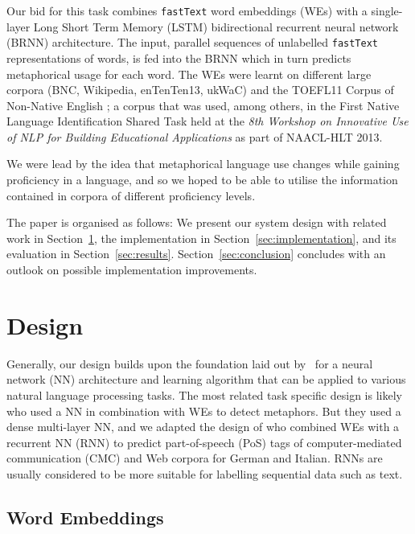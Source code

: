 \documentclass[11pt,a4paper]{article}
\newcommand\fT{\texttt{fastText}\xspace}
\begin{document}
Our bid for this task combines \fT \cite{bojanowski2016enriching} word embeddings (WEs) with a single-layer Long Short Term Memory (LSTM) bidirectional recurrent neural network (BRNN) architecture.
The input, parallel sequences of unlabelled \fT representations of words, is fed into the BRNN which in turn predicts metaphorical usage for each word. 
The WEs were learnt on different large corpora (BNC, Wikipedia, enTenTen13, ukWaC) and the TOEFL11 Corpus of Non-Native English \cite{ETS2:ETS202331}; a corpus that was used, among others, in the First Native Language Identification Shared Task \cite{tetreault-blanchard-cahill:2013:BEA} held at the \emph{8th Workshop on Innovative Use of NLP for Building Educational Applications} as part of NAACL-HLT 2013.

We were lead by the idea that metaphorical language use changes while gaining proficiency in a language, and so we hoped to be able to utilise the information contained in corpora of different proficiency levels.

The paper is organised as follows: We present our system design with related work in
Section~\ref{sec:design}, the implementation in
Section~\ref{sec:implementation}, and its evaluation in
Section~\ref{sec:results}. 
Section~\ref{sec:conclusion} concludes with an outlook on possible
implementation improvements.



\section{Design} %
\label{sec:design}

Generally, our design builds upon the foundation laid out by~ for a neural network (NN) architecture and learning algorithm that can be applied to various natural language processing tasks.
The most related task specific design is likely  who used a NN in combination with WEs to detect metaphors. 
But they used a dense multi-layer NN, and we adapted the design of  who combined WEs with a recurrent NN (RNN) to predict part-of-speech (PoS) tags of computer-mediated communication (CMC) and Web corpora for German and Italian.
RNNs are usually considered to be more suitable for labelling sequential data such as text.


\subsection{Word Embeddings} %
\label{subsec:we}
\end{document}

